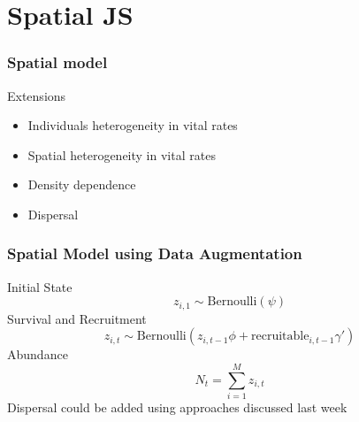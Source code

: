\documentclass[color=usenames,dvipsnames]{beamer}\usepackage[]{graphicx}\usepackage[]{color}
\begin{document}














\section{Spatial JS}






\begin{frame}
  \frametitle{Spatial model}
  \large
  {Extensions}
  \begin{itemize}
    \item Individuals heterogeneity in vital rates
    \item Spatial heterogeneity in vital rates
    \item Density dependence
    \item Dispersal
  \end{itemize}
\end{frame}




\begin{frame}
  \frametitle{Spatial Model using Data Augmentation}
  {Initial State}
  \[
    z_{i,1} \sim \mbox{Bernoulli}(\psi)
  \]
  \vfill
  {Survival and Recruitment}
  \[
    z_{i,t} \sim \mbox{Bernoulli}(z_{i,t-1}\phi + \mbox{recruitable}_{i,t-1}\gamma')
  \]
  \vfill
  {Abundance}
  \[
    N_t = \sum_{i=1}^M z_{i,t}
  \]
  \pause
  \vfill
  {\centering Dispersal could be added using approaches discussed last week \\}
\end{frame}
\end{document}
